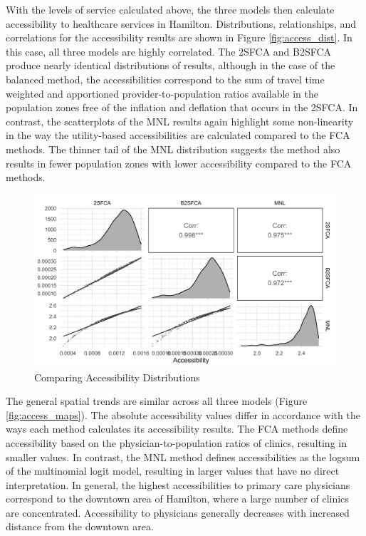 \documentclass{article}
\begin{document}
With the levels of service calculated above, the three models then
calculate accessibility to healthcare services in Hamilton.
Distributions, relationships, and correlations for the accessibility
results are shown in Figure \ref{fig:access_dist}. In this case, all
three models are highly correlated. The 2SFCA and B2SFCA produce nearly
identical distributions of results, although in the case of the balanced
method, the accessibilities correspond to the sum of travel time
weighted and apportioned provider-to-population ratios available in the
population zones free of the inflation and deflation that occurs in the
2SFCA. In contrast, the scatterplots of the MNL results again highlight
some non-linearity in the way the utility-based accessibilities are
calculated compared to the FCA methods. The thinner tail of the MNL
distribution suggests the method also results in fewer population zones
with lower accessibility compared to the FCA methods.

\begin{figure}
\includegraphics[width=1\linewidth]{./img/pair_plot_access} \caption{\label{fig:access_dist}Comparing Accessibility Distributions}\label{fig:access_dist_fig}
\end{figure}

The general spatial trends are similar across all three models (Figure
\ref{fig:access_maps}). The absolute accessibility values differ in
accordance with the ways each method calculates its accessibility
results. The FCA methods define accessibility based on the
physician-to-population ratios of clinics, resulting in smaller values.
In contrast, the MNL method defines accessibilities as the logsum of the
multinomial logit model, resulting in larger values that have no direct
interpretation. In general, the highest accessibilities to primary care
physicians correspond to the downtown area of Hamilton, where a large
number of clinics are concentrated. Accessibility to physicians
generally decreases with increased distance from the downtown area.
\end{document}
